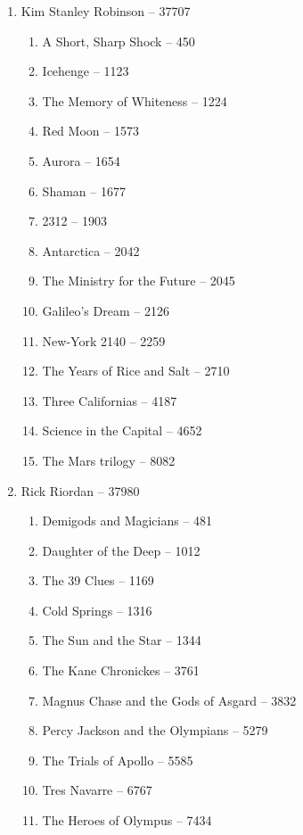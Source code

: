 \documentclass[a4paper, 11pt]{proc} %
\begin{document}
\begin{enumerate}
\begin{enumerate}
        \end{enumerate}
    \item Kim Stanley Robinson -- 37707
        \begin{enumerate}
            \item A Short, Sharp Shock -- 450
            \item Icehenge -- 1123
            \item The Memory of Whiteness -- 1224
            \item Red Moon -- 1573
            \item Aurora -- 1654
            \item Shaman -- 1677
            \item 2312 -- 1903
            \item Antarctica -- 2042
            \item The Ministry for the Future -- 2045
            \item Galileo's Dream -- 2126
            \item New-York 2140 -- 2259
            \item The Years of Rice and Salt -- 2710
            \item Three Californias -- 4187
            \item Science in the Capital -- 4652
            \item The Mars trilogy -- 8082
        \end{enumerate}
    \item Rick Riordan -- 37980
        \begin{enumerate}
            \item Demigods and Magicians -- 481
            \item Daughter of the Deep -- 1012
            \item The 39 Clues -- 1169
            \item Cold Springs -- 1316
            \item The Sun and the Star -- 1344
            \item The Kane Chronickes -- 3761
            \item Magnus Chase and the Gods of Asgard -- 3832
            \item Percy Jackson and the Olympians -- 5279
            \item The Trials of Apollo -- 5585
            \item Tres Navarre -- 6767
            \item The Heroes of Olympus -- 7434
        \end{enumerate}

\end{enumerate}
\end{document}
